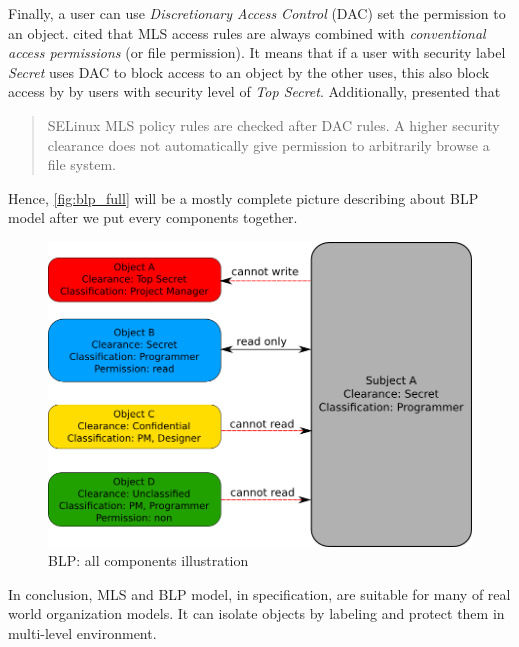 Finally, a user can use \emph{Discretionary Access Control} (DAC) set the permission to an object.
\cite{centos:2008} cited that MLS access rules are always combined with \emph{conventional access permissions} (or file permission).
It means that if a user with security label \emph{Secret} uses DAC to block access to an object by the other uses, this also block access by by users with security level of \emph{Top Secret}.
Additionally, \cite{bancinco:2015} presented that
\begin{quote}
SELinux MLS policy rules are checked after DAC rules. A higher security clearance does not automatically give permission to arbitrarily browse a file system.
\end{quote}
Hence, \autoref{fig:blp_full} will be a mostly complete picture describing about BLP model after we put every components together.

\begin{figure}[bth]
\myfloatalign
\includegraphics[width=1.0\linewidth]{gfx/chapter_2/blp_example}
\caption[BLP: all components illustration]{BLP: all components illustration}
\label{fig:blp_full}
\end{figure}

In conclusion, MLS and BLP model, in specification, are suitable for many of real world organization models.
It can isolate objects by labeling and protect them in multi-level environment.

%
%
%
